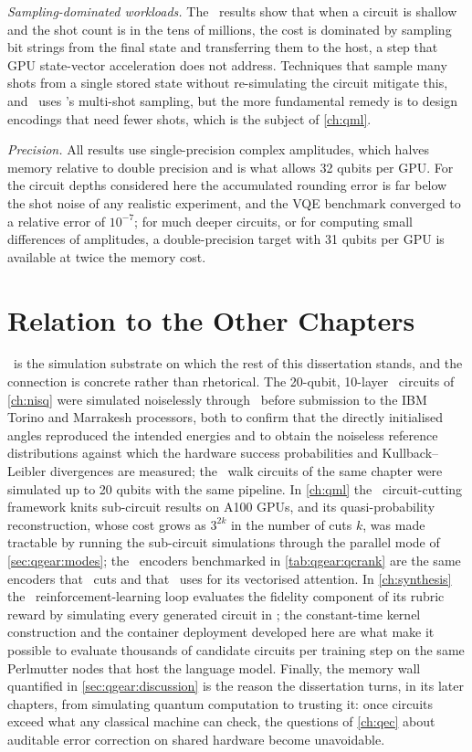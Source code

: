 \emph{Sampling-dominated workloads.} The \qcrank\ results show that when a circuit is shallow and the shot count is in the tens of millions, the cost is dominated by sampling bit strings from the final state and transferring them to the host, a step that GPU state-vector acceleration does not address. Techniques that sample many shots from a single stored state without re-simulating the circuit \cite{doi2023multishotgpu} mitigate this, and \qgear\ uses \cudaq's multi-shot sampling, but the more fundamental remedy is to design encodings that need fewer shots, which is the subject of \cref{ch:qml}.

\emph{Precision.} All results use single-precision complex amplitudes, which halves memory relative to double precision and is what allows 32 qubits per GPU. For the circuit depths considered here the accumulated rounding error is far below the shot noise of any realistic experiment, and the VQE benchmark converged to a relative error of $10^{-7}$; for much deeper circuits, or for computing small differences of amplitudes, a double-precision target with 31 qubits per GPU is available at twice the memory cost.

\section{Relation to the Other Chapters}\label{sec:qgear:relation}

\qgear\ is the simulation substrate on which the rest of this dissertation stands, and the connection is concrete rather than rhetorical. The 20-qubit, 10-layer \deal\ circuits of \cref{ch:nisq} were simulated noiselessly through \qgear\ before submission to the IBM Torino and Marrakesh processors, both to confirm that the directly initialised angles reproduced the intended energies and to obtain the noiseless reference distributions against which the hardware success probabilities and Kullback--Leibler divergences are measured; the \qawa\ walk circuits of the same chapter were simulated up to 20 qubits with the same pipeline. In \cref{ch:qml} the \shardq\ circuit-cutting framework knits sub-circuit results on A100 GPUs, and its quasi-probability reconstruction, whose cost grows as $3^{2k}$ in the number of cuts $k$, was made tractable by running the sub-circuit simulations through the parallel mode of \cref{sec:qgear:modes}; the \qcrank\ encoders benchmarked in \cref{tab:qgear:qcrank} are the same encoders that \shardq\ cuts and that \vqt\ uses for its vectorised attention. In \cref{ch:synthesis} the \rubriq\ reinforcement-learning loop evaluates the fidelity component of its rubric reward by simulating every generated circuit in \cudaq; the constant-time kernel construction and the container deployment developed here are what make it possible to evaluate thousands of candidate circuits per training step on the same Perlmutter nodes that host the language model. Finally, the memory wall quantified in \cref{sec:qgear:discussion} is the reason the dissertation turns, in its later chapters, from simulating quantum computation to trusting it: once circuits exceed what any classical machine can check, the questions of \cref{ch:qec} about auditable error correction on shared hardware become unavoidable.

